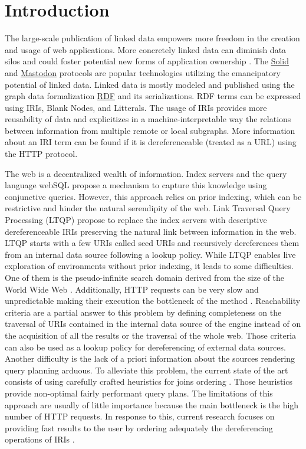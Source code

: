 \section{Introduction}
 
The large-scale publication of linked data empowers more freedom in the creation and usage of web applications.
More concretely linked data can diminish data silos \cite{Verstraete2022}
and could foster potential new forms of application ownership \cite{Mechant2021}.
The \href{https://solidproject.org/TR/protocol}{Solid} and
\href{https://docs.joinmastodon.org/}{Mastodon} protocols
are popular technologies utilizing the emancipatory potential of linked data.
Linked data is mostly modeled and published using the graph data formalization \href{https://www.w3.org/TR/rdf12-concepts/}{RDF} and its serializations.
RDF terms can be expressed using IRIs, Blank Nodes, and Litterals.
The usage of IRIs provides more reusability of data and explicitizes in a machine-interpretable way the relations between
information from multiple remote or local subgraphs.
More information about an IRI term can be found if it is dereferenceable (treated as a URL) using the HTTP protocol.


The web is a decentralized wealth of information.
Index servers and the query language webSQL \cite{Mendelzon1996} propose a mechanism to capture this knowledge using conjunctive queries.
However, this approach relies on prior indexing, which can be restrictive and hinder the natural serendipity of the web. 
Link Traversal Query Processing (LTQP) \cite{Hartig2012} propose to replace the index servers with descriptive dereferenceable IRIs 
preserving the natural link between information in the web.
LTQP starts with a few URIs called seed URIs and recursively dereferences them from an internal data source following a lookup policy.
While LTQP enables live exploration of environments without prior indexing, it leads to some difficulties.
One of them is the pseudo-infinite search domain derived from the size of the World Wide Web \cite{hartig2016walking}.
Additionally, HTTP requests can be very slow and unpredictable making their execution the bottleneck of the method \cite{hartig2016walking}.
Reachability criteria \cite{Hartig2012} are a partial answer to this problem by defining completeness on the traversal of URIs
contained in the internal data source of the engine instead of on the acquisition of all the results or the traversal of the whole web.
Those criteria can also be used as a lookup policy for dereferencing of external data sources.
Another difficulty is the lack of a priori information about the sources rendering query planning arduous.
To alleviate this problem, the current state of the art consists of using carefully crafted heuristics for joins ordering \cite{Hartig2011}.
Those heuristics provide non-optimal fairly performant query plans.
The limitations of this approach are usually of little importance because the main bottleneck is the high number of HTTP requests.
In response to this, current research focuses on providing fast results to the user by ordering adequately the dereferencing operations of IRIs \cite{hartig2016walking}.

